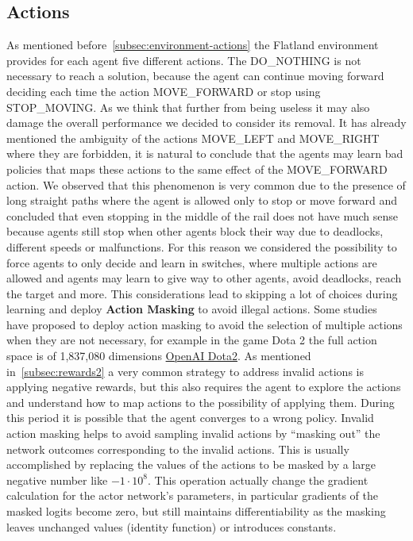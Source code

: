 \documentclass[11pt, a4paper, hidelinks]{report}
\begin{document}
\subsection{Actions}\label{subsec:actions}
As mentioned before~\ref{subsec:environment-actions} the Flatland environment provides for each agent five different actions.
The DO\_NOTHING is not necessary to reach a solution, because the agent can continue moving forward deciding each time the action MOVE\_FORWARD or stop using STOP\_MOVING\@.
As we think that further from being useless it may also damage the overall performance we decided to consider its removal.
It has already mentioned the ambiguity of the actions MOVE\_LEFT and MOVE\_RIGHT where they are forbidden, it is natural to conclude that the agents may learn bad policies that maps these actions to the same effect of the MOVE\_FORWARD action.
We observed that this phenomenon is very common due to the presence of long straight paths where the agent is allowed only to stop or move forward and concluded that even stopping in the middle of the rail does not have much sense because agents still stop when other agents block their way due to deadlocks, different speeds or malfunctions.
For this reason we considered the possibility to force agents to only decide and learn in switches, where multiple actions are allowed and agents may learn to give way to other agents, avoid deadlocks, reach the target and more.
This considerations lead to skipping a lot of choices during learning and deploy \textbf{Action Masking} to avoid illegal actions.
Some studies~\citep{ppo-action-masking} have proposed to deploy action masking to avoid the selection of multiple actions when they are not necessary, for example in the game Dota 2 the full action space is of 1,837,080 dimensions \href{https://cdn.openai.com/dota-2.pdf}{OpenAI Dota2}.
As mentioned in~\ref{subsec:rewards2} a very common strategy to address invalid actions is applying negative rewards, but this also requires the agent to explore the actions and understand how to map actions to the possibility of applying them.
During this period it is possible that the agent converges to a wrong policy.
Invalid action masking helps to avoid sampling invalid actions by ``masking out'' the network outcomes corresponding to the invalid actions.
This is usually accomplished by replacing the values of the actions to be masked by a large negative number like $-1 \cdot 10^8$.
This operation actually change the gradient calculation for the actor network's parameters, in particular gradients of the masked logits become zero, but still maintains differentiability as the masking leaves unchanged values (identity function) or introduces constants.
\end{document}
